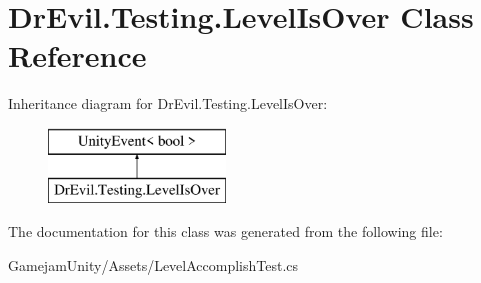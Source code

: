 \hypertarget{class_dr_evil_1_1_testing_1_1_level_is_over}{}\section{Dr\+Evil.\+Testing.\+Level\+Is\+Over Class Reference}
\label{class_dr_evil_1_1_testing_1_1_level_is_over}
Inheritance diagram for Dr\+Evil.\+Testing.\+Level\+Is\+Over\+:\begin{figure}[H]
\begin{center}
\leavevmode
\includegraphics[height=2.000000cm]{class_dr_evil_1_1_testing_1_1_level_is_over}
\end{center}
\end{figure}


The documentation for this class was generated from the following file\+:\begin{DoxyCompactItemize}
\item 
Gamejam\+Unity/\+Assets/Level\+Accomplish\+Test.\+cs\end{DoxyCompactItemize}
